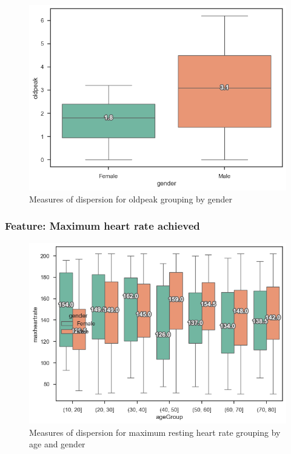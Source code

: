 \begin{figure}
    \caption{Measures of dispersion for oldpeak grouping by gender}\label{boxplot-oldpeak-gender}
    \centering
    \includegraphics[width=\linewidth]{media/boxplot-02-gender-oldpeak.png}
\end{figure}

\subsubsection{Feature: Maximum heart rate achieved}

\begin{figure}
    \caption{Measures of dispersion for maximum resting heart rate grouping by age and gender}\label{boxplot-heartrate-age}
    \centering
    \includegraphics[width=\linewidth]{media/boxplot-03-agegroup-gender-heartrate.png}
\end{figure}

